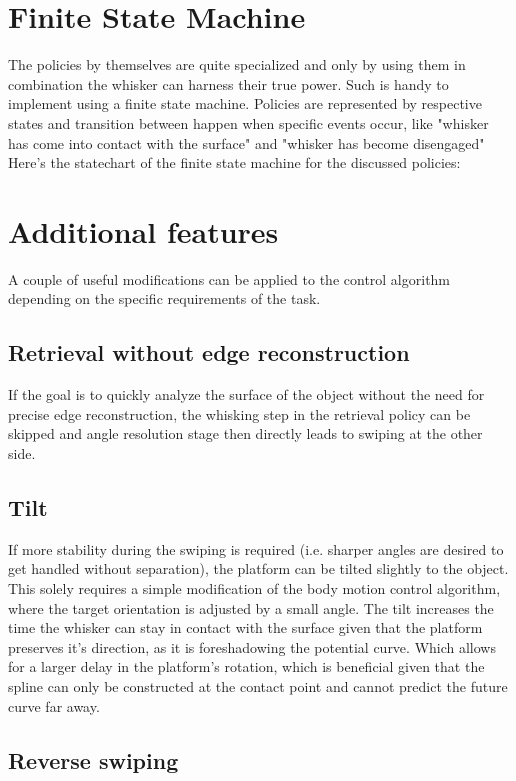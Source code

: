 \section{Finite State Machine}
The policies by themselves are quite specialized and only by using them in combination the whisker can harness their true power.
Such is handy to implement using a finite state machine.
Policies are represented by respective states and transition between happen when specific events occur, like "whisker has come into contact with the surface" and "whisker has become disengaged"
Here's the statechart of the finite state machine for the discussed policies:


\section{Additional features}

A couple of useful modifications can be applied to the control algorithm depending on the specific requirements of the task.

\subsection{Retrieval without edge reconstruction}

If the goal is to quickly analyze the surface of the object without the need for precise edge reconstruction, the whisking step in the retrieval policy can be skipped and angle resolution stage then directly leads to swiping at the other side.

\subsection{Tilt}

If more stability during the swiping is required (i.e. sharper angles are desired to get handled without separation), the platform can be tilted slightly to the object.
This solely requires a simple modification of the body motion control algorithm, where the target orientation is adjusted by a small angle.
The tilt increases the time the whisker can stay in contact with the surface given that the platform preserves it's direction, as it is foreshadowing the potential curve.
Which allows for a larger delay in the platform's rotation, which is beneficial given that the spline can only be constructed at the contact point and cannot predict the future curve far away.

\subsection{Reverse swiping}

